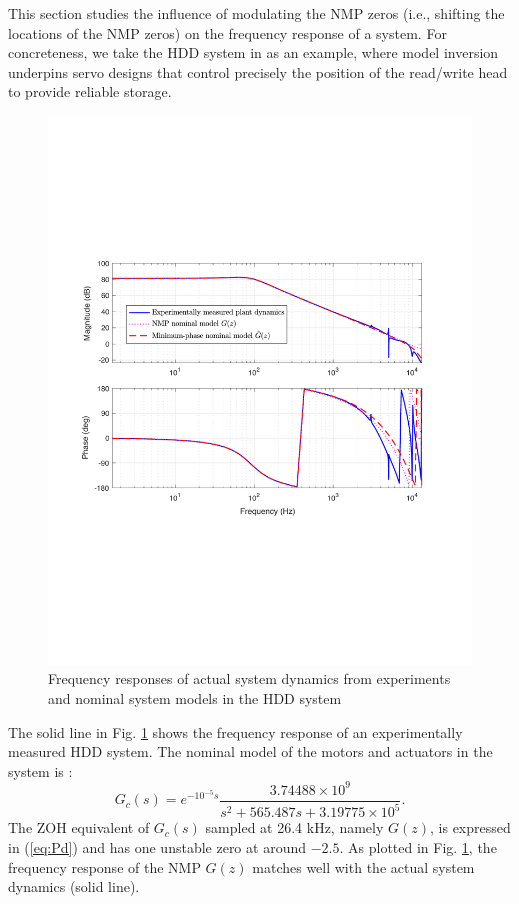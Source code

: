 \documentclass [11pt, proquest] {uwthesis}[2020/02/24]
\begin{document}
This section studies the influence of modulating the NMP zeros (i.e.,
shifting the locations of the NMP zeros) on the frequency response
of a system. For concreteness, we take the HDD system in \cite{chen2011minimum}
as an example, where model inversion underpins servo designs that
control precisely the position of the read/write head to provide reliable
storage.
\begin{figure}[!ht]
\begin{centering}
\includegraphics[width=13cm]{Model-inversion/bode_hdd_notchedP_Pn_3P_4}
\par\end{centering}
\caption{\label{fig:Nominal-model-inversion}Frequency responses of actual
system dynamics from experiments and nominal system models in the
HDD system}
\end{figure}

The solid line in Fig. \ref{fig:Nominal-model-inversion} shows the
frequency response of an experimentally measured HDD system. The
nominal model of the motors and actuators in the system is \cite{chen2011minimum}:
\begin{equation}
G_{c}(s)=e^{-10^{-5}s}\frac{3.74488\times10^{9}}{s^{2}+565.487s+3.19775\times10^{5}}.\label{eq:Ps}
\end{equation}
The ZOH equivalent of $G_{c}(s)$ sampled at 26.4 kHz, namely $G(z)$,
is expressed in (\ref{eq:Pd}) and has one unstable zero at around
$-2.5$. As plotted in Fig. \ref{fig:Nominal-model-inversion}, the frequency
response of the NMP $G(z)$ matches well with the actual system dynamics
(solid line).
\end{document}
